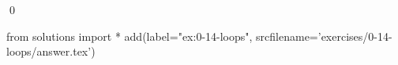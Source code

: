 
\begin{ex}
  \label{ex:0-14-loops}
  
  \qed
\end{ex}
\begin{python0}
from solutions import *
add(label="ex:0-14-loops",
    srcfilename='exercises/0-14-loops/answer.tex')
\end{python0}
